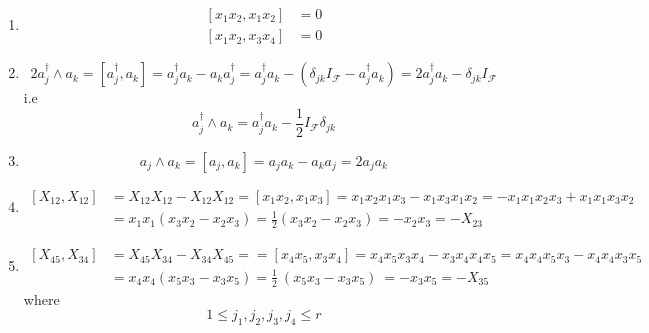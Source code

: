\documentclass[aps,preprint]{revtex4}%
\begin{document}
\begin{enumerate}
\begin{enumerate}
\begin{enumerate}
\item If $j_{2}=$ $j_{1}$
\begin{equation}
x_{j_{2}}^{2}=\frac{1}{2}I_{\mathcal{F}}%
\end{equation}
so
\begin{equation}
\left(  \left.  x_{j_{1}}\right\vert x_{j_{1}}\right)  =\frac{1}{2}.
\end{equation}

\end{enumerate}

\item
\begin{align}
\left[  x_{1}x_{2},x_{1}x_{2}\right]   &  =0\\
\left[  x_{1}x_{2},x_{3}x_{4}\right]   &  =0
\end{align}


\item
\begin{equation}
2a_{j}^{\dagger}\wedge a_{k}=\left[  a_{j}^{\dagger},a_{k}\right]
=a_{j}^{\dagger}a_{k}-a_{k}a_{j}^{\dagger}=a_{j}^{\dagger}a_{k}-\left(
\delta_{jk}I_{\mathcal{F}}-a_{j}^{\dagger}a_{k}\right)  =2a_{j}^{\dagger}%
a_{k}-\delta_{jk}I_{\mathcal{F}}%
\end{equation}
i.e
\begin{equation}
a_{j}^{\dagger}\wedge a_{k}=a_{j}^{\dagger}a_{k}-\frac{1}{2}I_{\mathcal{F}%
}\delta_{jk}%
\end{equation}


\item
\begin{equation}
a_{j}\wedge a_{k}=\left[  a_{j},a_{k}\right]  =a_{j}a_{k}-a_{k}a_{j}%
=2a_{j}a_{k}%
\end{equation}


\item
\begin{align}
\left[  X_{12},X_{12}\right]   &  =X_{12}X_{12}-X_{12}X_{12}=\left[
x_{1}x_{2},x_{1}x_{3}\right]  =x_{1}x_{2}x_{1}x_{3}-x_{1}x_{3}x_{1}%
x_{2}=-x_{1}x_{1}x_{2}x_{3}+x_{1}x_{1}x_{3}x_{2}\\
\  &  =x_{1}x_{1}\left(  x_{3}x_{2}-x_{2}x_{3}\right)  =\frac{1}{2}\left(
x_{3}x_{2}-x_{2}x_{3}\right)  =-x_{2}x_{3}=-X_{23}%
\end{align}


\item
\begin{align}
\left[  X_{45},X_{34}\right]   &  =X_{45}X_{34}-X_{34}X_{45}==\left[
x_{4}x_{5},x_{3}x_{4}\right]  =x_{4}x_{5}x_{3}x_{4}-x_{3}x_{4}x_{4}x_{5}%
=x_{4}x_{4}x_{5}x_{3}-x_{4}x_{4}x_{3}x_{5}\\
&  =x_{4}x_{4}\left(  x_{5}x_{3}-x_{3}x_{5}\right)  =\frac{1}{2}\ \left(
x_{5}x_{3}-x_{3}x_{5}\right)  \ =-x_{3}x_{5}=-X_{35}%
\end{align}
where
\begin{equation}
1\leq j_{1},j_{2},j_{3},j_{4}\leq r
\end{equation}



\end{enumerate}
\end{enumerate}
\end{document}
